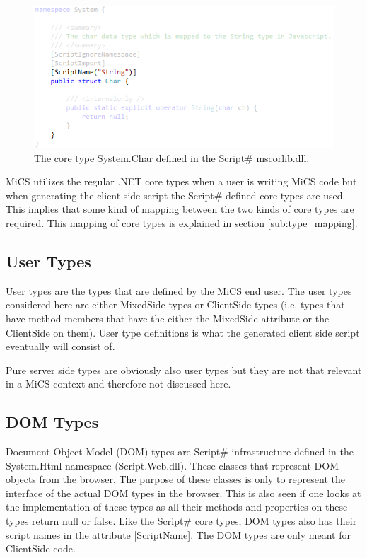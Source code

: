 	\begin{figure}[H]
			\includegraphics[width=13cm]{resources/images/Char.png}
		\caption{The core type System.Char defined in the Script\# mscorlib.dll.}
		\label{char}
	\end{figure}

		MiCS utilizes the regular .NET core types when a user is writing MiCS code but when generating the client side script the Script\# defined core types are used. This implies that some kind of mapping between the two kinds of core types are required. This mapping of core types is explained in section \ref{sub:type_mapping}.

	\subsection{User Types} %
	\label{sub:user_types}
		User types are the types that are defined by the MiCS end user. The user types considered here are either MixedSide types or ClientSide types (i.e. types that have method members that have the either the MixedSide attribute or the ClientSide on them). User type definitions is what the generated client side script eventually will consist of. 

		Pure server side types are obviously also user types but they are not that relevant in a MiCS context and therefore not discussed here.

	\subsection{DOM Types} %
	\label{sub:dom_types}
		Document Object Model (DOM) types are Script\# infrastructure defined in the System.Html namespace (Script.Web.dll). These classes that represent DOM objects from the browser. The purpose of these classes is only to represent the interface of the actual DOM types in the browser. This is also seen if one looks at the implementation of these types as all their methods and properties on these types return null or false. Like the Script\# core types, DOM types also has their script names in the attribute [ScriptName]. The DOM types are only meant for ClientSide code.

